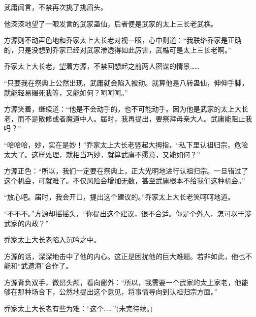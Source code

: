 \begin{this_body}
武庸闻言，不禁再次挑了挑眉头。

他深深地望了一眼发言的武家蛊仙，后者便是武家的太上三长老武樵。

方源则不动声色地和乔家太上大长老对视一眼，心中则道：“我联络乔家是正确的，只是没想到乔家已经对武家渗透得如此厉害，武樵可是太上三长老啊。”

乔家太上大长老，望着方源，不禁回想起之前两人密谋的情景……

“只要我在祭典上公然出现，武庸就会陷入被动。就算他是八转蛊仙，伸伸手脚，就能轻易碾死我等，又能如何？呵呵呵。”

方源笑着，继续道：“他是不会动手的，也不可能动手。因为他是武家的太上大长老，而不是散修或者魔道中人。届时，我再提出，要祭拜母亲大人。武庸能阻止我吗？”

“哈哈哈，妙，实在是妙！”乔家太上大长老竖起大拇指，“私下里认祖归宗，危险太大了。这样处理，就相当巧妙，就算武庸不愿意，又能如何？”

方源正色：“所以，我们一定要在祭典上，正大光明地进行认祖归宗。一旦错过了这个机会，可就难了。不仅风险会增加无数，甚至武庸根本不给我们这种机会。”

“放心吧。届时，我会开口，提出这个建议的。”乔家太上大长老笑呵呵地道。

“不不不。”方源却摇摇头，“你提出这个建议，很不合适。你是个外人，怎可以干涉武家的内政？”

乔家太上大长老陷入沉吟之中。

方源的话，深深地击中了他的内心。这正是困扰他的巨大难题。若非如此，他也不能和“武遗海”合作了。

方源背负双手，微昂头颅，看向窗外：“所以，我需要一个武家的太上家老，他能够在那种场合下，公然地提出这个意见，将事情导向到认祖归宗方面。”

乔家太上大长老有些为难：“这个……”(未完待续。)

\end{this_body}

